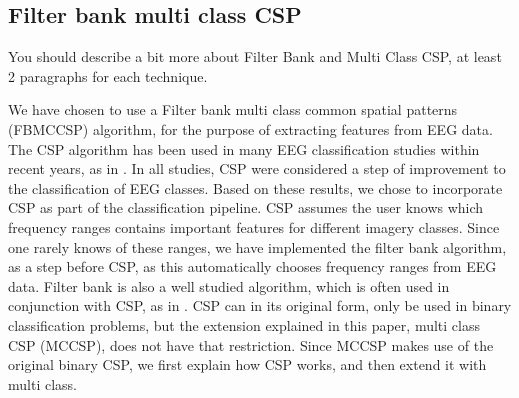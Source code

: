\subsection{Filter bank multi class CSP}

You should describe a bit more about Filter Bank and Multi Class CSP, at least 2 paragraphs for each technique.


We have chosen to use a Filter bank multi class common spatial patterns (FBMCCSP) algorithm, for the purpose of extracting features from EEG data. The CSP algorithm has been used in many EEG classification studies within recent years, as in \cite{ang2012filter}. In all studies, CSP were considered a step of improvement to the classification of EEG classes. Based on these results, we chose to incorporate CSP as part of the classification pipeline. CSP assumes the user knows which frequency ranges contains important features for different imagery classes. Since one rarely knows of these ranges, we have implemented the filter bank algorithm, as a step before CSP, as this automatically chooses frequency ranges from EEG data. Filter bank is also a well studied algorithm, which is often used in conjunction with CSP, as in \cite{ang2008filter}. CSP can in its original form, only be used in binary classification problems, but the extension explained in this paper, multi class CSP (MCCSP), does not have that restriction. Since MCCSP makes use of the original binary CSP, we first explain how CSP works, and then extend it with multi class.


